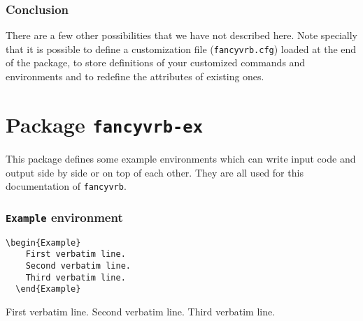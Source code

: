 \documentclass{article}
\begin{document}
\begin{changebar}
\iffalse

\section{Thanks}

  For interesting comments and suggestions, we would like to thank specially
(alphabetic order): Philippe \textsc{Esperet}
\url{esperet@marie.polytechnique.fr}, Michael \textsc{Friendly}
\url{friendly@hotspur.psych.yorku.ca}, Rolf \textsc{Niepraschk}
\url{niepraschk@gmx.de} and for bug reports Mario \textsc{Hassler}
\relax\unskip\break
\url{HASSLER@ippnv2.ipp.kfa-juelich.de}, Mikhail \textsc{Kolodin}
\relax\unskip\break
\url{myke@morrigan.spb.su}, Andreas Matthias, Ulrich M. Schwarz, and Vladimir \textsc{Volovich}
\verb+<vvv@vvv.vsu.ru>+.


\fi
\section{Conclusion}

  There are a few other possibilities that we have not described here.
Note specially that it is possible to define a customization file
(\texttt{fancyvrb.cfg}) loaded at the end of the package, to store
definitions of your customized commands and environments and to redefine
the attributes of existing ones.


\clearpage


\part{Package \texttt{fancyvrb-ex}}
This package defines some example environments which can write input code
and output side by side or on top of each other. They are all used for this documentation of \texttt{fancyvrb}.

\section{\texttt{Example} environment}

\begin{Verbatim}[gobble=2]
  \begin{Example}
    First verbatim line.
    Second verbatim line.
    Third verbatim line.
  \end{Example}
\end{Verbatim}

\begin{Example}
  First verbatim line.
  Second verbatim line.
  Third verbatim line.
\end{Example}


\end{changebar}
\end{document}
